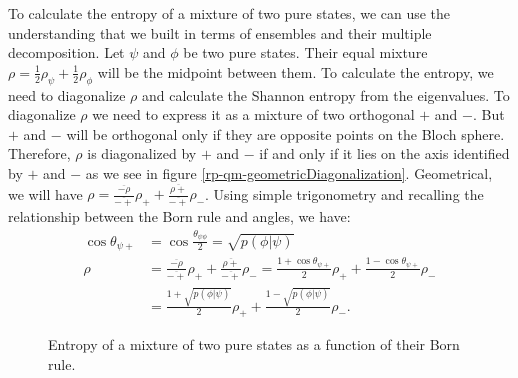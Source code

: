 To calculate the entropy of a mixture of two pure states, we can use the understanding that we built in terms of ensembles and their multiple decomposition. Let $\psi$ and $\phi$ be two pure states. Their equal mixture $\rho=\frac{1}{2}\rho_{\psi} + \frac{1}{2}\rho_{\phi}$ will be the midpoint between them. To calculate the entropy, we need to diagonalize $\rho$ and calculate the Shannon entropy from the eigenvalues. To diagonalize $\rho$ we need to express it as a mixture of two orthogonal $+$ and $-$. But $+$ and $-$ will be orthogonal only if they are opposite points on the Bloch sphere. Therefore, $\rho$ is diagonalized by $+$ and $-$ if and only if it lies on the axis identified by $+$ and $-$ as we see in figure \ref{rp-qm-geometricDiagonalization}. Geometrical, we will have $\rho = \frac{\overline{-\rho}}{\overline{-+}}\rho_{+} + \frac{\overline{\rho+}}{\overline{-+}}\rho_{-}$. Using simple trigonometry and recalling the relationship between the Born rule and angles, we have:
\begin{equation}
	\begin{aligned}
		\cos \theta_{\psi+} &= \cos \frac{\theta_{\psi\phi}}{2} = \sqrt{p(\phi|\psi)} \\
		\rho &= \frac{\overline{-\rho}}{\overline{-+}}\rho_{+} + \frac{\overline{\rho+}}{\overline{-+}}\rho_{-} = \frac{1+\cos \theta_{\psi+}}{2}\rho_{+} + \frac{1-\cos \theta_{\psi+}}{2}\rho_{-} \\
		&= \frac{1+\sqrt{p(\phi|\psi)}}{2}\rho_{+} + \frac{1-\sqrt{p(\phi|\psi)}}{2}\rho_{-}.
	\end{aligned}
\end{equation}


\begin{figure}
	\centering
	\caption {Entropy of a mixture of two pure states as a function of their Born rule.} \label{fig_rp_qm_entropyVsProb}
\end{figure}


